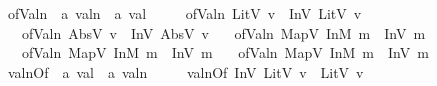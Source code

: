 \begin{isabellebody}\isanewline
{}\isamarkupfalse%
\ ofValn\ {\isacharcolon}{\kern0pt}{\isacharcolon}{\kern0pt}\ {\isachardoublequoteopen}{\isacharprime}{\kern0pt}a\ valn\ {\isasymRightarrow}\ {\isacharprime}{\kern0pt}a\ val{}{}{}{}{\isachardoublequoteclose}\ \isanewline
\ \ \ \ {\isachardoublequoteopen}ofValn\ {\isacharparenleft}{\kern0pt}LitV\ v{\isacharparenright}{\kern0pt}\ {\isacharequal}{\kern0pt}\ {\isacharparenleft}{\kern0pt}InV{}\ {\isacharparenleft}{\kern0pt}LitV{}\ v{\isacharparenright}{\kern0pt}{\isacharparenright}{\kern0pt}{\isachardoublequoteclose}\isanewline
\ \ {\isacharbar}{\kern0pt}\ {\isachardoublequoteopen}ofValn\ {\isacharparenleft}{\kern0pt}AbsV\ v{\isacharparenright}{\kern0pt}\ {\isacharequal}{\kern0pt}\ {\isacharparenleft}{\kern0pt}InV{}\ {\isacharparenleft}{\kern0pt}AbsV{}\ v{\isacharparenright}{\kern0pt}{\isacharparenright}{\kern0pt}{\isachardoublequoteclose}\isanewline
\ \ {\isacharbar}{\kern0pt}\ {\isachardoublequoteopen}ofValn\ {\isacharparenleft}{\kern0pt}MapV\ {\isacharparenleft}{\kern0pt}InM{}\ m{\isacharparenright}{\kern0pt}{\isacharparenright}{\kern0pt}\ {\isacharequal}{\kern0pt}\ {\isacharparenleft}{\kern0pt}InV{}\ m{\isacharparenright}{\kern0pt}{\isachardoublequoteclose}\isanewline
\ \ {\isacharbar}{\kern0pt}\ {\isachardoublequoteopen}ofValn\ {\isacharparenleft}{\kern0pt}MapV\ {\isacharparenleft}{\kern0pt}InM{}\ m{\isacharparenright}{\kern0pt}{\isacharparenright}{\kern0pt}\ {\isacharequal}{\kern0pt}\ {\isacharparenleft}{\kern0pt}InV{}\ m{\isacharparenright}{\kern0pt}{\isachardoublequoteclose}\isanewline
\ \ {\isacharbar}{\kern0pt}\ {\isachardoublequoteopen}ofValn\ {\isacharparenleft}{\kern0pt}MapV\ {\isacharparenleft}{\kern0pt}InM{}\ m{\isacharparenright}{\kern0pt}{\isacharparenright}{\kern0pt}\ {\isacharequal}{\kern0pt}\ {\isacharparenleft}{\kern0pt}InV{}\ m{\isacharparenright}{\kern0pt}{\isachardoublequoteclose}\isanewline
\isanewline
{}\isamarkupfalse%
\ valnOf\ {\isacharcolon}{\kern0pt}{\isacharcolon}{\kern0pt}\ {\isachardoublequoteopen}{\isacharprime}{\kern0pt}a\ val{}{}{}{}\ {\isasymRightarrow}\ {\isacharprime}{\kern0pt}a\ valn{\isachardoublequoteclose}\ \isanewline
\ \ \ \ {\isachardoublequoteopen}valnOf\ {\isacharparenleft}{\kern0pt}InV{}\ {\isacharparenleft}{\kern0pt}LitV{}\ v{\isacharparenright}{\kern0pt}{\isacharparenright}{\kern0pt}\ {\isacharequal}{\kern0pt}\ {\isacharparenleft}{\kern0pt}LitV\ v{\isacharparenright}{\kern0pt}{\isachardoublequoteclose}\isanewline

\end{isabellebody}
